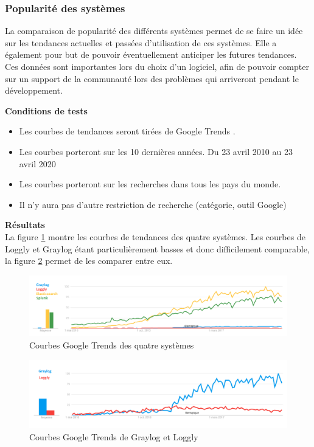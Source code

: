\documentclass[paper=a4, fontsize=11pt]{scrartcl}
\begin{document}
\justify

\subsubsection{Popularité des systèmes}

La comparaison de popularité des différents systèmes permet de se faire un idée sur les tendances actuelles et passées d'utilisation de ces systèmes. Elle a également pour but de pouvoir éventuellement anticiper les futures tendances. Ces données sont importantes lors du choix d'un logiciel, afin de pouvoir compter sur un support de la communauté lors des problèmes qui arriveront pendant le développement.

\textbf{Conditions de tests} \\

\begin{itemize}
    \item Les courbes de tendances seront tirées de Google Trends \cite{noauthor_google_nodate}.
    \item Les courbes porteront sur les 10 dernières années.
    \subitem Du 23 avril 2010 au 23 avril 2020
    \item Les courbes porteront sur les recherches dans tous les pays du monde.
    \item Il n'y aura pas d'autre restriction de recherche (catégorie, outil Google)
\end{itemize}

\textbf{Résultats} \\
La figure \ref{f-Trends4Systemes} montre les courbes de tendances des quatre systèmes. Les courbes de Loggly et Graylog étant particulièrement basses et donc difficilement comparable, la figure \ref{f-Trends2Systemes} permet de les comparer entre eux.

\begin{figure}[H]
    \centering
    \includegraphics[width=18cm]{img/screenshots/Tendance_4.png}
    \caption{Courbes Google Trends des quatre systèmes}
    \label{f-Trends4Systemes}
\end{figure}

\begin{figure}[H]
    \centering
    \includegraphics[width=18cm]{img/screenshots/Tendance_2.png}
    \caption{Courbes Google Trends de Graylog et Loggly}
    \label{f-Trends2Systemes}
\end{figure}
\end{document}
